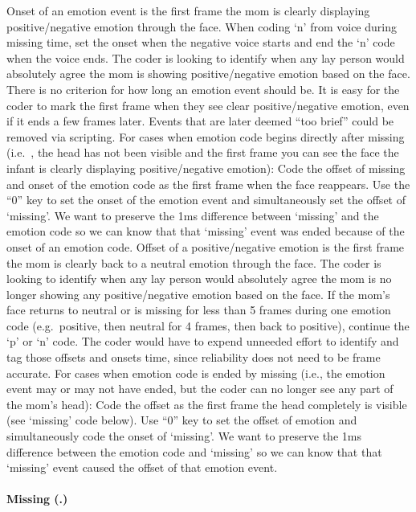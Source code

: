 \documentclass[
]{book}
\begin{document}
Onset of an emotion event is the first frame the mom is clearly displaying positive/negative emotion through the face. When coding `n' from voice during missing time, set the onset when the negative voice starts and end the `n' code when the voice ends. The coder is looking to identify when any lay person would absolutely agree the mom is showing positive/negative emotion based on the face.
There is no criterion for how long an emotion event should be. It is easy for the coder to mark the first frame when they see clear positive/negative emotion, even if it ends a few frames later. Events that are later deemed ``too brief'' could be removed via scripting.
For cases when emotion code begins directly after missing (i.e.~, the head has not been visible and the first frame you can see the face the infant is clearly displaying positive/negative emotion): Code the offset of missing and onset of the emotion code as the first frame when the face reappears. Use the ``0'' key to set the onset of the emotion event and simultaneously set the offset of `missing'. We want to preserve the 1ms difference between `missing' and the emotion code so we can know that that `missing' event was ended because of the onset of an emotion code.
Offset of a positive/negative emotion is the first frame the mom is clearly back to a neutral emotion through the face. The coder is looking to identify when any lay person would absolutely agree the mom is no longer showing any positive/negative emotion based on the face.
If the mom's face returns to neutral or is missing for less than 5 frames during one emotion code (e.g.~positive, then neutral for 4 frames, then back to positive), continue the `p' or `n' code. The coder would have to expend unneeded effort to identify and tag those offsets and onsets time, since reliability does not need to be frame accurate.
For cases when emotion code is ended by missing (i.e., the emotion event may or may not have ended, but the coder can no longer see any part of the mom's head): Code the offset as the first frame the head completely is visible (see `missing' code below). Use ``0'' key to set the offset of emotion and simultaneously code the onset of `missing'. We want to preserve the 1ms difference between the emotion code and `missing' so we can know that that `missing' event caused the offset of that emotion event.

\hypertarget{mom_head_not_visible}{%
\paragraph{Missing (.)}\label{mom_head_not_visible}}
\end{document}
